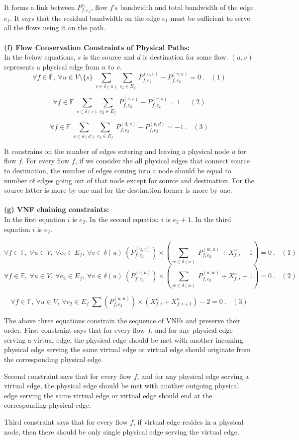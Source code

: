 \documentclass{article}
\begin{document}
It forms a link between \(P_{f,e_2}^{e_1}\), flow \(f\)'s bandwidth and total bandwidth of the edge \(e_1\). It says that the residual bandwidth on the edge \(e_1\) must be sufficient to serve all the flows using it on the path.\\
\\
\textbf{(f) Flow Conservation Constraints of Physical Paths:}\\
In the below equations, \(s\) is the source and \(d\) is destination for some flow. \((u,v)\) represents a physical edge from \(u\) to \(v\).
\[\forall{f\in \mathbb{F}},\ \forall{u\in V\setminus \{s\}}\ \sum_{v \in \delta(u)} \sum_{e_2 \in E_f} \ P_{f,e_2}^{(u,v)}-P_{f,e_2}^{(v,u)}=0\ .\ \ \ \ (1)\]

\[\forall{f\in \mathbb{F}}\ \sum_{v \in \delta(s)} \sum_{e_2 \in E_f} \ P_{f,e_2}^{(s,v)}-P_{f,e_2}^{(v,s)}=1\ .\ \ \ \ (2)\]

\[\forall{f\in \mathbb{F}}\ \sum_{v \in \delta(d)} \sum_{e_2 \in E_f} \ P_{f,e_2}^{(d,v)}-P_{f,e_2}^{(v,d)}=-1\ .\ \ \ \ (3)\]

It constrains on the number of edges entering and leaving a physical node \(u\) for flow \(f\). For every flow \(f\), if we consider the all physical edges that connect source to destination, the number of edges coming into a node should be equal to number of edges going out of that node except for source and destination. For the source latter is more by one and for the destination former is more by one.\\
\\
\textbf{(g) VNF chaining constraints:}\\
In the first equation \(i\) is \(e_2\). In the second equation \(i\) is \(e_2+1\). In the third equation \(i\) is \(e_2\).

\[\forall{f\in \mathbb{F}},\  \forall{u \in V},\  \forall{e_2 \in E_f},\ \forall{v \in \delta(u)}\ (P_{f,e_2}^{(u,v)}) \times (\sum_{w \in \delta(u)}\ P_{f,e_2}^{(w,u)} + X_{f,i}^u -1) = 0\ .\ \ \ \ (1)\]
\[\forall{f\in \mathbb{F}},\  \forall{u \in V},\  \forall{e_2 \in E_f},\ \forall{v \in \delta(u)}\ (P_{f,e_2}^{(v,u)}) \times (\sum_{w \in \delta(u)}\ P_{f,e_2}^{(u,w)} + X_{f,i}^u -1) = 0\ .\ \ \ \ (2)\]


\[\forall{f\in \mathbb{F}},\  \forall{u \in V},\  \forall{e_2 \in E_f}\ \sum{(P_{f,e_2}^{(u,u)})\times(X_{f,i}^u+X_{f,i+1}^u)-2} = 0\ .\ \ \ \ (3)\]

The above three equations constrain the sequence of VNFs and preserve their order. First constraint says that for every flow \(f\), and for any physical edge serving a virtual edge, the physical edge should be met with another incoming physical edge serving the same virtual edge or virtual edge should originate from the corresponding physical edge.

Second constraint says that for every flow \(f\), and for any physical edge serving a virtual edge, the physical edge should be met with another outgoing physical edge serving the same virtual edge or virtual edge should end at the corresponding physical edge.

Third constraint says that for every flow \(f\), if virtual edge resides in a physical node, then there should be only single physical edge serving the virtual edge.  
\end{document}
